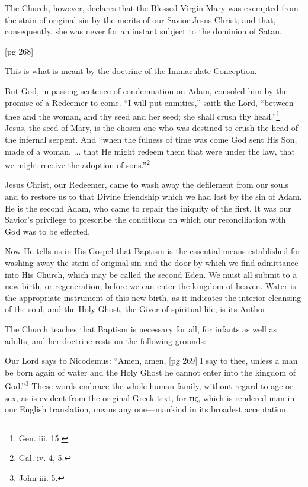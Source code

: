 The Church, however, declares that the Blessed
Virgin Mary was exempted from the stain of
original sin by the merits of our Savior Jesus
Christ; and that, consequently, she was never
for an instant subject to the dominion of Satan.

[pg 268]

This is what is meant by the doctrine of the Immaculate
Conception.

But God, in passing sentence of condemnation
on Adam, consoled him by the promise of a Redeemer
to come. “I will put enmities,” saith the
Lord, “between thee and the woman, and thy
seed and her seed; she shall crush thy head.”\footnote{Gen. iii. 15.}
Jesus, the seed of Mary, is the chosen one who
was destined to crush the head of the infernal
serpent. And “when the fulness of time was
come God sent His Son, made of a woman, ...
that He might redeem them that were under the
law, that we might receive the adoption of
sons.”\footnote{Gal. iv. 4, 5.}

Jesus Christ, our Redeemer, came to wash away
the defilement from our souls and to restore us
to that Divine friendship which we had lost by
the sin of Adam. He is the second Adam, who
came to repair the iniquity of the first. It was
our Savior's privilege to prescribe the conditions
on which our reconciliation with God was to be
effected.

Now He tells us in His Gospel that Baptism is
the essential means established for washing away
the stain of original sin and the door by which
we find admittance into His Church, which may
be called the second Eden. We must all submit
to a new birth, or regeneration, before we can
enter the kingdom of heaven. Water is the appropriate
instrument of this new birth, as it indicates
the interior cleansing of the soul; and the
Holy Ghost, the Giver of spiritual life, is its Author.

The Church teaches that Baptism is necessary
for all, for infants as well as adults, and her doctrine
rests on the following grounds:

Our Lord says to Nicodemus: “Amen, amen,
[pg 269]
I say to thee, unless a man be born again of
water and the Holy Ghost he cannot enter into the
kingdom of God.”\footnote{John iii.
5.} These words embrace the
whole human family, without regard to age or
sex, as is evident from the original Greek text,
for τις, which is rendered man in our English
translation, means any one—mankind in its broadest
acceptation.


